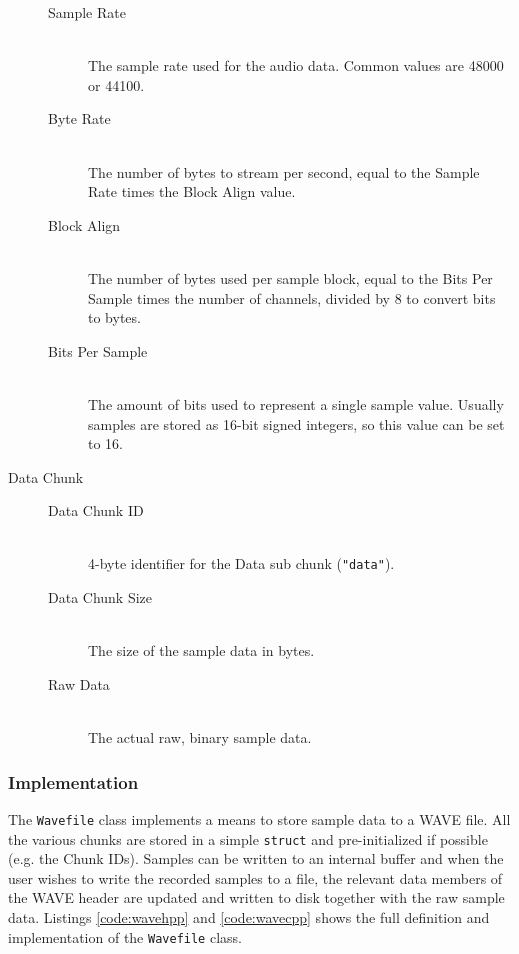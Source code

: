 \begin{description}
\begin{description}
    \item[Sample Rate] \hfill \\ The sample rate used for the audio data. Common values are 48000 or 44100.

    \item[Byte Rate] \hfill \\ The number of bytes to stream per second, equal to the Sample Rate times the Block Align value.

    \item[Block Align] \hfill \\ The number of bytes used per sample block, equal to the Bits Per Sample times the number of channels, divided by 8 to convert bits to bytes.

    \item[Bits Per Sample] \hfill \\ The amount of bits used to represent a single sample value. Usually samples are stored as 16-bit signed integers, so this value can be set to 16.

  \end{description}

  \item[Data Chunk] \hfill

  \begin{description}

    \item[Data Chunk ID] \hfill \\ 4-byte identifier for the Data sub chunk (\texttt{"data"}).

    \item[Data Chunk Size] \hfill \\ The size of the sample data in bytes.

    \item[Raw Data] \hfill \\ The actual raw, binary sample data.

  \end{description}

\end{description}

\subsubsection{Implementation}

The \texttt{Wavefile} class implements a means to store sample data to a WAVE file. All the various chunks are stored in a simple \texttt{struct} and pre-initialized if possible (e.g. the Chunk IDs). Samples can be written to an internal buffer and when the user wishes to write the recorded samples to a file, the relevant data members of the WAVE header are updated and written to disk together with the raw sample data. Listings \ref{code:wavehpp} and \ref{code:wavecpp} shows the full definition and implementation of the \texttt{Wavefile} class.

